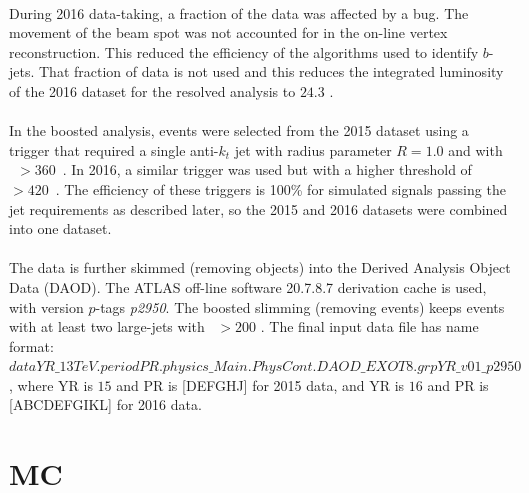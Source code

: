 \paragraph{}
During 2016 data-taking, a fraction of the data was affected by a bug.
The movement of the beam spot was not accounted for in the on-line vertex reconstruction.
This reduced the efficiency of the algorithms used to identify $b$-jets.
That fraction of data is not used and this reduces the integrated luminosity of the 2016 dataset for the resolved analysis to $24.3$ \ifb.

\paragraph{}
In the boosted analysis, events were selected from the 2015 dataset using a trigger that required a single anti-$k_t$ jet with radius parameter $R=1.0$ and with \pt~$>360$~\GeV. In 2016, a similar trigger was used but with a higher threshold of \pt~$>420$~\GeV. The efficiency of these triggers is 100\% for simulated signals passing the jet requirements as described later, so the 2015 and 2016 datasets were combined into one dataset. 

\paragraph{}
The data is further skimmed (removing objects) into the Derived Analysis Object Data (DAOD). The ATLAS off-line software 20.7.8.7 derivation cache is used, with version $p$-tags \textit{p2950}. The boosted slimming (removing events) keeps events with at least two large-\R jets with \pt~$>200$ \GeV. The final input data file has name format:\\
$dataYR\_13TeV.periodPR.physics\_Main.PhysCont.DAOD\_EXOT8.grpYR\_v01\_p2950$, 
where YR is $15$ and PR is [DEFGHJ] for 2015 data, and YR is $16$ and PR is [ABCDEFGIKL] for 2016 data.


\section{MC}
\label{sec:MC}
